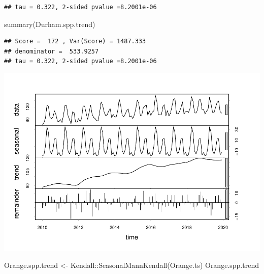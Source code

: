 \documentclass[
  12pt,
]{article}
\newenvironment{Shaded}{\begin{snugshade}}{\end{snugshade}}
\newcommand{\AttributeTok}[1]{\textcolor[rgb]{0.77,0.63,0.00}{#1}}
\newcommand{\CommentTok}[1]{\textcolor[rgb]{0.56,0.35,0.01}{\textit{#1}}}
\newcommand{\DecValTok}[1]{\textcolor[rgb]{0.00,0.00,0.81}{#1}}
\newcommand{\FunctionTok}[1]{\textcolor[rgb]{0.00,0.00,0.00}{#1}}
\newcommand{\NormalTok}[1]{#1}
\newcommand{\OtherTok}[1]{\textcolor[rgb]{0.56,0.35,0.01}{#1}}
\newcommand{\SpecialCharTok}[1]{\textcolor[rgb]{0.00,0.00,0.00}{#1}}
\newcommand{\StringTok}[1]{\textcolor[rgb]{0.31,0.60,0.02}{#1}}
\begin{document}
\begin{verbatim}
## tau = 0.322, 2-sided pvalue =8.2001e-06
\end{verbatim}

\begin{Shaded}
\begin{Highlighting}[]
\FunctionTok{summary}\NormalTok{(Durham.spp.trend)}
\end{Highlighting}
\end{Shaded}

\begin{verbatim}
## Score =  172 , Var(Score) = 1487.333
## denominator =  533.9257
## tau = 0.322, 2-sided pvalue =8.2001e-06
\end{verbatim}

\begin{Shaded}
\end{Shaded}

\includegraphics{Project_Template_files/figure-latex/county SPP TS-2.pdf}

\begin{Shaded}
\begin{Highlighting}[]
\NormalTok{Orange.spp.trend }\OtherTok{\textless{}{-}}\NormalTok{ Kendall}\SpecialCharTok{::}\FunctionTok{SeasonalMannKendall}\NormalTok{(Orange.ts) }
\NormalTok{Orange.spp.trend}
\end{Highlighting}
\end{Shaded}
\end{document}
